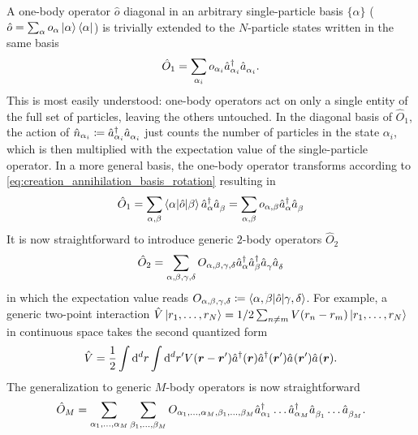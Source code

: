 A one-body operator $\hat o$ diagonal in an arbitrary single-particle basis $\{\alpha\}$ ($\hat o = \sum_\alpha o_{\alpha}\ket{\alpha}\bra{\alpha}$) is trivially extended to the $N$-particle states written in the same basis
\begin{align}
    \hat O_1
    = \sum_{\alpha_i} o_{\alpha_i}\hat a^\dag_{\alpha_i}\hat a^\pdag_{\alpha_i}.
\end{align}
This is most easily understood: one-body operators act on only a single entity of the full set of particles, leaving the others untouched.
In the diagonal basis of $\hat O_1$, the action of $\hat n_{\alpha_i}\coloneqq \hat a^\dag_{\alpha_i}\hat a^\pdag_{\alpha_i}$ just counts the number of particles in the state $\alpha_i$, which is then multiplied with the expectation value of the single-particle operator.
In a more general basis, the one-body operator transforms according to \cref{eq:creation_annihilation_basis_rotation} resulting in
\begin{align}
    \hat O_1 = \sum_{\alpha, \beta}\braket{\alpha | \hat o | \beta} \hat a^\dag_\alpha \hat a^\pdag_\beta = \sum_{\alpha,\beta}o_{\alpha,\beta}\hat a^\dag_\alpha \hat a^\pdag_\beta
    \label{eq:one_body_operator}
\end{align}
It is now straightforward to introduce generic $2$-body operators $\hat O_2$
\begin{align}
    \hat O_2 = \sum_{\alpha,\beta,\gamma,\delta}O_{\alpha,\beta,\gamma,\delta}\hat a^\dag_\alpha \hat a^\dag_\beta \hat a^\pdag_\gamma \hat a^\pdag_\delta
\end{align}
in which the expectation value reads $O_{\alpha,\beta,\gamma,\delta}\coloneqq \braket{\alpha,\beta | \hat o | \gamma,\delta}$.
For example, a generic two-point interaction $\hat V\ket{r_1,\dots,r_N}=1/2\sum_{n\neq m}V(r_n-r_m)\ket{r_1,\dots,r_N}$ in continuous space takes the second quantized form
\begin{align}
    \hat V = \frac12\int{\rd^d r}\int{\rd^d r'}V({\bm r}-{\bm r'})\hat a^\dag({\bm r})\hat a^\dag({\bm r'})\hat a^\pdag({\bm r'})\hat a^\pdag({\bm r}).
    \label{eq:two_point_interaction}
\end{align}
The generalization to generic $M$-body operators is now straightforward
\begin{align}
    \hat O_M = \sum_{\alpha_1,\dots,\alpha_M}\sum_{\beta_1,\dots,\beta_M}O_{\alpha_1,\dots,\alpha_M,\beta_1,\dots,\beta_M}\hat a^\dag_{\alpha_1}\dots \hat a^\dag_{\alpha_M}\hat a^\pdag_{\beta_1}\dots \hat a^\pdag_{\beta_M}.
\end{align}
%
%
